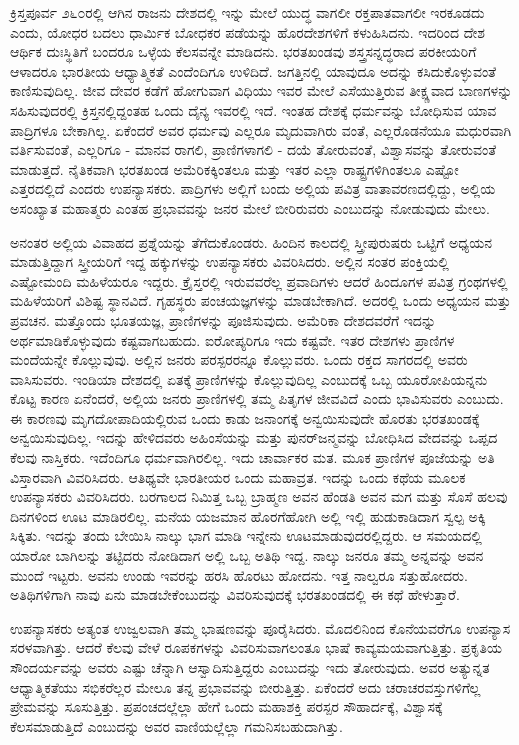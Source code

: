 ಕ್ರಿಸ್ತಪೂರ್ವ ೨೬೦ರಲ್ಲಿ ಆಗಿನ ರಾಜನು ದೇಶದಲ್ಲಿ ಇನ್ನು ಮೇಲೆ ಯುದ್ಧ ವಾಗಲೀ ರಕ್ತಪಾತವಾಗಲೀ ಇರಕೂಡದು ಎಂದು, ಯೋಧರ ಬದಲು ಧಾರ್ಮಿಕ ಬೋಧಕರ ಪಡೆಯನ್ನು ಹೊರದೇಶಗಳಿಗೆ ಕಳುಹಿಸಿದನು. ಇದರಿಂದ ದೇಶ ಆರ್ಥಿಕ ದುಃಸ್ಥಿತಿಗೆ ಬಂದರೂ ಒಳ್ಳೆಯ ಕೆಲಸವನ್ನೇ ಮಾಡಿದನು. ಭರತಖಂಡವು ಶಸ್ತ್ರಸನ್ನದ್ಧರಾದ ಪರಕೀಯರಿಗೆ ಆಳಾದರೂ ಭಾರತೀಯ ಆಧ್ಯಾತ್ಮಿಕತೆ ಎಂದೆಂದಿಗೂ ಉಳಿದಿದೆ. ಜಗತ್ತಿನಲ್ಲಿ ಯಾವುದೂ ಅದನ್ನು ಕಸಿದುಕೊಳ್ಳುವಂತೆ ಕಾಣಿಸುವುದಿಲ್ಲ. ಜೀವ ದೇವರ ಕಡೆಗೆ ಹೋಗುವಾಗ ವಿಧಿಯು ಇವರ ಮೇಲೆ ಎಸೆಯುತ್ತಿರುವ ತೀಕ್ಷ್ಣವಾದ ಬಾಣಗಳನ್ನು ಸಹಿಸುವುದರಲ್ಲಿ ಕ್ರಿಸ್ತನಲ್ಲಿದ್ದಂತಹ ಒಂದು ದೈನ್ಯ ಇವರಲ್ಲಿ ಇದೆ. ಇಂತಹ ದೇಶಕ್ಕೆ ಧರ್ಮವನ್ನು ಬೋಧಿಸುವ ಯಾವ ಪಾದ್ರಿಗಳೂ ಬೇಕಾಗಿಲ್ಲ. ಏಕೆಂದರೆ ಅವರ ಧರ್ಮವು ಎಲ್ಲರೂ ಮೃದುವಾಗಿರು ವಂತೆ, ಎಲ್ಲರೊಡನೆಯೂ ಮಧುರವಾಗಿ ವರ್ತಿಸುವಂತೆ, ಎಲ್ಲರಿಗೂ - ಮಾನವ ರಾಗಲಿ, ಪ್ರಾಣಿಗಳಾಗಲಿ - ದಯೆ ತೋರುವಂತೆ, ವಿಶ್ವಾಸವನ್ನು ತೋರುವಂತೆ ಮಾಡುತ್ತದೆ. ನೈತಿಕವಾಗಿ ಭರತಖಂಡ ಅಮೆರಿಕಕ್ಕಿಂತಲೂ ಮತ್ತು ಇತರ ಎಲ್ಲಾ ರಾಷ್ಟ್ರಗಳಿಗಿಂತಲೂ ಎಷ್ಟೋ ಎತ್ತರದಲ್ಲಿದೆ ಎಂದರು ಉಪನ್ಯಾಸಕರು. ಪಾದ್ರಿಗಳು ಅಲ್ಲಿಗೆ ಬಂದು ಅಲ್ಲಿಯ ಪವಿತ್ರ ವಾತಾವರಣದಲ್ಲಿದ್ದು, ಅಲ್ಲಿಯ ಅಸಂಖ್ಯಾತ ಮಹಾತ್ಮರು ಎಂತಹ ಪ್ರಭಾವವನ್ನು ಜನರ ಮೇಲೆ ಬೀರಿರುವರು ಎಂಬುದನ್ನು ನೋಡುವುದು ಮೇಲು.

ಅನಂತರ ಅಲ್ಲಿಯ ವಿವಾಹದ ಪ್ರಶ್ನೆಯನ್ನು ತೆಗೆದುಕೊಂಡರು. ಹಿಂದಿನ ಕಾಲದಲ್ಲಿ ಸ್ತ್ರೀಪುರುಷರು ಒಟ್ಟಿಗೆ ಅಧ್ಯಯನ ಮಾಡುತ್ತಿದ್ದಾಗ ಸ್ತ್ರೀಯರಿಗೆ ಇದ್ದ ಹಕ್ಕುಗಳನ್ನು ಉಪನ್ಯಾಸಕರು ವಿವರಿಸಿದರು. ಅಲ್ಲಿನ ಸಂತರ ಪಂಕ್ತಿಯಲ್ಲಿ ಎಷ್ಟೋಮಂದಿ ಮಹಿಳೆಯರೂ ಇದ್ದರು. ಕ್ರೈಸ್ತರಲ್ಲಿ ಇರುವವರೆಲ್ಲ ಪ್ರವಾದಿಗಳು ಆದರೆ ಹಿಂದೂಗಳ ಪವಿತ್ರ ಗ್ರಂಥಗಳಲ್ಲಿ ಮಹಿಳೆಯರಿಗೆ ವಿಶಿಷ್ಟ ಸ್ಥಾನವಿದೆ. ಗೃಹಸ್ಥರು ಪಂಚಯಜ್ಞಗಳನ್ನು ಮಾಡಬೇಕಾಗಿದೆ. ಅದರಲ್ಲಿ ಒಂದು ಅಧ್ಯಯನ ಮತ್ತು ಪ್ರವಚನ. ಮತ್ತೊಂದು ಭೂತಯಜ್ಞ, ಪ್ರಾಣಿಗಳನ್ನು ಪೂಜಿಸುವುದು. ಅಮೆರಿಕಾ ದೇಶದವರೆಗೆ ಇದನ್ನು ಅರ್ಥಮಾಡಿಕೊಳ್ಳುವುದು ಕಷ್ಟವಾಗಬಹುದು. ಐರೋಪ್ಯರಿಗೂ ಇದು ಕಷ್ಟವೇ. ಇತರ ದೇಶಗಳು ಪ್ರಾಣಿಗಳ ಮಂದೆಯನ್ನೇ ಕೊಲ್ಲುವುವು. ಅಲ್ಲಿನ ಜನರು ಪರಸ್ಪರರನ್ನೂ ಕೊಲ್ಲುವರು. ಒಂದು ರಕ್ತದ ಸಾಗರದಲ್ಲಿ ಅವರು ವಾಸಿಸುವರು. ಇಂಡಿಯಾ ದೇಶದಲ್ಲಿ ಏತಕ್ಕೆ ಪ್ರಾಣಿಗಳನ್ನು ಕೊಲ್ಲುವುದಿಲ್ಲ ಎಂಬುದಕ್ಕೆ ಒಬ್ಬ ಯೂರೋಪಿಯನ್ನನು ಕೊಟ್ಟ ಕಾರಣ ಏನೆಂದರೆ, ಅಲ್ಲಿಯ ಜನರು ಪ್ರಾಣಿಗಳಲ್ಲಿ ತಮ್ಮ ಪಿತೃಗಳ ಜೀವವಿದೆ ಎಂದು ಭಾವಿಸುವರು ಎಂಬುದು. ಈ ಕಾರಣವು ಮೃಗದೋಪಾದಿಯಲ್ಲಿರುವ ಒಂದು ಕಾಡು ಜನಾಂಗಕ್ಕೆ ಅನ್ವಯಿಸುವುದೇ ಹೊರತು ಭರತಖಂಡಕ್ಕೆ ಅನ್ವಯಿಸುವುದಿಲ್ಲ. ಇದನ್ನು ಹೇಳಿದವರು ಅಹಿಂಸೆಯನ್ನು ಮತ್ತು ಪುನರ್​ಜನ್ಮವನ್ನು ಬೋಧಿಸಿದ ವೇದವನ್ನು ಒಪ್ಪದ ಕೆಲವು ನಾಸ್ತಿಕರು. ಇದೆಂದಿಗೂ ಧರ್ಮವಾಗಿರಲಿಲ್ಲ. ಇದು ಚಾರ್ವಾಕರ ಮತ. ಮೂಕ ಪ್ರಾಣಿಗಳ ಪೂಜೆಯನ್ನು ಅತಿ ವಿಸ್ತಾರವಾಗಿ ವಿವರಿಸಿದರು. ಆತಿಥ್ಯವೇ ಭಾರತೀಯರ ಒಂದು ಮಹಾವ್ರತ. ಇದನ್ನು ಒಂದು ಕಥೆಯ ಮೂಲಕ ಉಪನ್ಯಾಸಕರು ವಿವರಿಸಿದರು. ಬರಗಾಲದ ನಿಮಿತ್ತ ಒಬ್ಬ ಬ್ರಾಹ್ಮಣ ಅವನ ಹೆಂಡತಿ ಅವನ ಮಗ ಮತ್ತು ಸೊಸೆ ಹಲವು ದಿನಗಳಿಂದ ಊಟ ಮಾಡಿರಲಿಲ್ಲ. ಮನೆಯ ಯಜಮಾನ ಹೊರಗೆಹೋಗಿ ಅಲ್ಲಿ ಇಲ್ಲಿ ಹುಡುಕಾಡಿದಾಗ ಸ್ವಲ್ಪ ಅಕ್ಕಿ ಸಿಕ್ಕಿತು. ಇದನ್ನು ತಂದು ಬೇಯಿಸಿ ನಾಲ್ಕು ಭಾಗ ಮಾಡಿ ಇನ್ನೇನು ಊಟಮಾಡುವುದರಲ್ಲಿದ್ದರು. ಆ ಸಮಯದಲ್ಲಿ ಯಾರೋ ಬಾಗಿಲನ್ನು ತಟ್ಟಿದರು ನೋಡಿದಾಗ ಅಲ್ಲಿ ಒಬ್ಬ ಅತಿಥಿ ಇದ್ದ. ನಾಲ್ಕು ಜನರೂ ತಮ್ಮ ಅನ್ನವನ್ನು ಅವನ ಮುಂದೆ ಇಟ್ಟರು. ಅವನು ಉಂಡು ಇವರನ್ನು ಹರಸಿ ಹೊರಟು ಹೋದನು. ಇತ್ತ ನಾಲ್ವರೂ ಸತ್ತುಹೋದರು. ಅತಿಥಿಗಳಿಗಾಗಿ ನಾವು ಏನು ಮಾಡಬೇಕೆಂಬುದನ್ನು ವಿವರಿಸುವುದಕ್ಕೆ ಭರತಖಂಡದಲ್ಲಿ ಈ ಕಥೆ ಹೇಳುತ್ತಾರೆ.

ಉಪನ್ಯಾಸಕರು ಅತ್ಯಂತ ಉಜ್ವಲವಾಗಿ ತಮ್ಮ ಭಾಷಣವನ್ನು ಪೂರೈಸಿದರು. ಮೊದಲಿನಿಂದ ಕೊನೆಯವರೆಗೂ ಉಪನ್ಯಾಸ ಸರಳವಾಗಿತ್ತು. ಆದರೆ ಕೆಲವು ವೇಳೆ ರೂಪಕಗಳನ್ನು ವಿವರಿಸುವಾಗಲಂತೂ ಭಾಷೆ ಕಾವ್ಯಮಯವಾಗುತ್ತಿತ್ತು. ಪ್ರಕೃತಿಯ ಸೌಂದರ್ಯವನ್ನು ಅವರು ಎಷ್ಟು ಚೆನ್ನಾಗಿ ಆಸ್ವಾದಿಸುತ್ತಿದ್ದರು ಎಂಬುದನ್ನು ಇದು ತೋರುವುದು. ಅವರ ಅತ್ಯುನ್ನತ ಆಧ್ಯಾತ್ಮಿಕತೆಯು ಸಭಿಕರೆಲ್ಲರ ಮೇಲೂ ತನ್ನ ಪ್ರಭಾವವನ್ನು ಬೀರುತ್ತಿತ್ತು. ಏಕೆಂದರೆ ಅದು ಚರಾಚರವಸ್ತುಗಳಿಗೆಲ್ಲ ಪ್ರೇಮವನ್ನು ಸೂಸುತ್ತಿತ್ತು. ಪ್ರಪಂಚದಲ್ಲೆಲ್ಲಾ ಹೇಗೆ ಒಂದು ಮಹಾಶಕ್ತಿ ಪರಸ್ಪರ ಸೌಹಾರ್ದಕ್ಕೆ, ವಿಶ್ವಾಸಕ್ಕೆ ಕೆಲಸಮಾಡುತ್ತಿದೆ ಎಂಬುದನ್ನು ಅವರ ವಾಣಿಯಲ್ಲೆಲ್ಲಾ ಗಮನಿಸಬಹುದಾಗಿತ್ತು.

